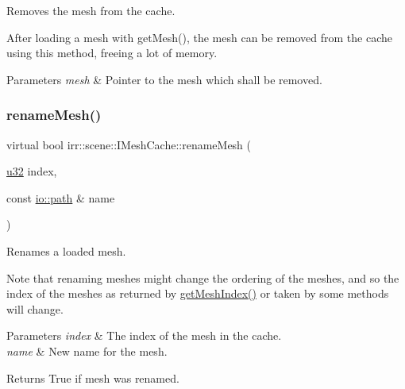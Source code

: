 Removes the mesh from the cache. 

After loading a mesh with get\+Mesh(), the mesh can be removed from the cache using this method, freeing a lot of memory. 
\begin{DoxyParams}{Parameters}
{\em mesh} & Pointer to the mesh which shall be removed. \\
\hline
\end{DoxyParams}
\mbox{\label{classirr_1_1scene_1_1IMeshCache_a820743b703cdc4362a3dbe6664271bcb}} 
\subsubsection{\texorpdfstring{rename\+Mesh()}{renameMesh()}\hspace{0.1cm}{\footnotesize\ttfamily [1/2]}}
{\footnotesize\ttfamily virtual bool irr\+::scene\+::\+I\+Mesh\+Cache\+::rename\+Mesh (\begin{DoxyParamCaption}\item[{\hyperlink{namespaceirr_a0416a53257075833e7002efd0a18e804}{u32}}]{index,  }\item[{const \hyperlink{namespaceirr_1_1io_ab1bdc45edb3f94d8319c02bc0f840ee1}{io\+::path} \&}]{name }\end{DoxyParamCaption})\hspace{0.3cm}{\ttfamily [pure virtual]}}



Renames a loaded mesh. 

Note that renaming meshes might change the ordering of the meshes, and so the index of the meshes as returned by \hyperlink{classirr_1_1scene_1_1IMeshCache_a2b3512bd3ff11d0b290fa5d2d580eb54}{get\+Mesh\+Index()} or taken by some methods will change. 
\begin{DoxyParams}{Parameters}
{\em index} & The index of the mesh in the cache. \\
\hline
{\em name} & New name for the mesh. \\
\hline
\end{DoxyParams}
\begin{DoxyReturn}{Returns}
True if mesh was renamed. 
\end{DoxyReturn}
\mbox{\label{classirr_1_1scene_1_1IMeshCache_a4533c81f4f3df112fa106d6fb1118f3b}} 
